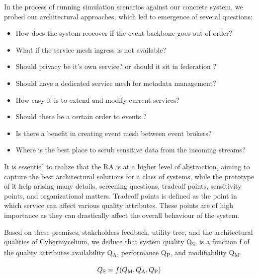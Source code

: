 \documentclass[review]{elsarticle}
\begin{document}
In the process of running simulation scenarios against our concrete system, we probed our architectural approaches, which led to emergence of several questions; 

\begin{itemize}
    \item How does the system reocover if the event backbone goes out of order?
    \item What if the service mesh ingress is not available? 
    \item Should privacy be it's own service? or should it sit in federation ?
    \item Should have a dedicated service mesh for metadata management? 
    \item How easy it is to extend and modify current services?
    \item Should there be a certain order to events ? 
    \item Is there a benefit in creating event mesh between event brokers? 
    \item Where is the best place to scrub sensitive data from the incoming streams?
\end{itemize}

It is essential to realize that the RA is at a higher level of abstraction, aiming to capture the best architectural solutions for a class of systems, while the prototype of it help arising many details, screening questions, tradeoff points, sensitivity points, and organizational matters. Tradeoff points is defined as the point in which service can affect various quality attributes. These points are of high importance as they can drastically affect the overall behaviour of the system. 

Based on these premises, stakeholders feedback, utility tree, and the architectural qualities of Cybermycelium, we deduce that system quality Q\textsubscript{S}, is a function f of the quality attributes availability Q\textsubscript{A}, performance Q\textsubscript{P}, and modifiability Q\textsubscript{M}.

\begin{equation}
    Q\textsubscript{S} = f(Q\textsubscript{M}, Q\textsubscript{A}, Q\textsubscript{P})
\end{equation}
\end{document}
